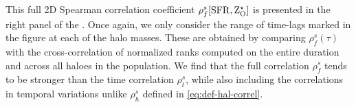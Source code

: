 This full 2D Spearman correlation coefficient $\rho^s_f[\rm{SFR},Z^{\star}_{\rm{O}}]$ is presented in the right panel of the .
Once again, we only consider the range of time-lags marked in the figure at each of the halo masses. These are obtained by comparing $\rho^s_f(\tau)$ with the cross-correlation of normalized ranks computed on the entire duration and across all haloes in the population. We find that the full correlation $\rho^s_f$ tends to be stronger than the time correlation $\rho^s_t$, while also including the correlations in temporal variations unlike $\rho^s_h$ defined in \eqref{eq:def-hal-correl}.


